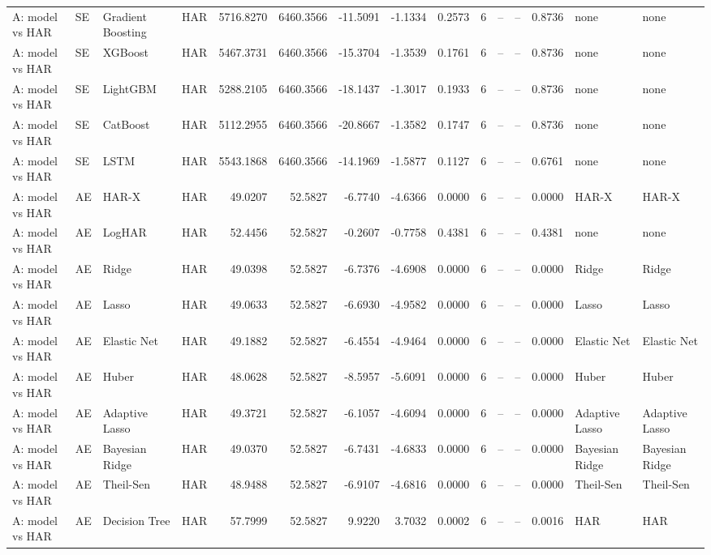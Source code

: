\begin{table}[htbp]
{\begin{tabular}{llllrrrrrrrrrll}
A: model vs HAR & SE & Gradient Boosting & HAR & 5716.8270 & 6460.3566 & -11.5091 & -1.1334 & 0.2573 & 6 & -- & -- & 0.8736 & none & none \\
A: model vs HAR & SE & XGBoost & HAR & 5467.3731 & 6460.3566 & -15.3704 & -1.3539 & 0.1761 & 6 & -- & -- & 0.8736 & none & none \\
A: model vs HAR & SE & LightGBM & HAR & 5288.2105 & 6460.3566 & -18.1437 & -1.3017 & 0.1933 & 6 & -- & -- & 0.8736 & none & none \\
A: model vs HAR & SE & CatBoost & HAR & 5112.2955 & 6460.3566 & -20.8667 & -1.3582 & 0.1747 & 6 & -- & -- & 0.8736 & none & none \\
A: model vs HAR & SE & LSTM & HAR & 5543.1868 & 6460.3566 & -14.1969 & -1.5877 & 0.1127 & 6 & -- & -- & 0.6761 & none & none \\
A: model vs HAR & AE & HAR-X & HAR & 49.0207 & 52.5827 & -6.7740 & -4.6366 & 0.0000 & 6 & -- & -- & 0.0000 & HAR-X & HAR-X \\
A: model vs HAR & AE & LogHAR & HAR & 52.4456 & 52.5827 & -0.2607 & -0.7758 & 0.4381 & 6 & -- & -- & 0.4381 & none & none \\
A: model vs HAR & AE & Ridge & HAR & 49.0398 & 52.5827 & -6.7376 & -4.6908 & 0.0000 & 6 & -- & -- & 0.0000 & Ridge & Ridge \\
A: model vs HAR & AE & Lasso & HAR & 49.0633 & 52.5827 & -6.6930 & -4.9582 & 0.0000 & 6 & -- & -- & 0.0000 & Lasso & Lasso \\
A: model vs HAR & AE & Elastic Net & HAR & 49.1882 & 52.5827 & -6.4554 & -4.9464 & 0.0000 & 6 & -- & -- & 0.0000 & Elastic Net & Elastic Net \\
A: model vs HAR & AE & Huber & HAR & 48.0628 & 52.5827 & -8.5957 & -5.6091 & 0.0000 & 6 & -- & -- & 0.0000 & Huber & Huber \\
A: model vs HAR & AE & Adaptive Lasso & HAR & 49.3721 & 52.5827 & -6.1057 & -4.6094 & 0.0000 & 6 & -- & -- & 0.0000 & Adaptive Lasso & Adaptive Lasso \\
A: model vs HAR & AE & Bayesian Ridge & HAR & 49.0370 & 52.5827 & -6.7431 & -4.6833 & 0.0000 & 6 & -- & -- & 0.0000 & Bayesian Ridge & Bayesian Ridge \\
A: model vs HAR & AE & Theil-Sen & HAR & 48.9488 & 52.5827 & -6.9107 & -4.6816 & 0.0000 & 6 & -- & -- & 0.0000 & Theil-Sen & Theil-Sen \\
A: model vs HAR & AE & Decision Tree & HAR & 57.7999 & 52.5827 & 9.9220 & 3.7032 & 0.0002 & 6 & -- & -- & 0.0016 & HAR & HAR \\

\end{tabular}}
\end{table}
